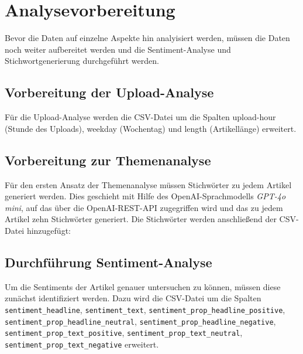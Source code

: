 \documentclass[12pt]{article}
\begin{document}
\begin{sloppypar}
	

	\section{Analysevorbereitung}

	Bevor die Daten auf einzelne Aspekte hin analyisiert werden, müssen die
	Daten noch weiter aufbereitet werden und die Sentiment-Analyse und
	Stichwortgenerierung durchgeführt werden.

	\subsection{Vorbereitung der Upload-Analyse}

	Für die Upload-Analyse werden die CSV-Datei um die Spalten upload-hour
	(Stunde des Uploads), weekday (Wochentag) und length (Artikellänge)
	erweitert.

	

	\subsection{Vorbereitung zur Themenanalyse}

	Für den ersten Ansatz der Themenanalyse müssen Stichwörter zu jedem Artikel
	generiert werden. Dies geschieht mit Hilfe des OpenAI-Sprachmodells
	\emph{GPT-4o mini}, auf das über die OpenAI-REST-API zugegriffen wird und
	das zu jedem Artikel zehn Stichwörter generiert. Die Stichwörter werden
	anschließend der CSV-Datei hinzugefügt:

	

	\subsection{Durchführung Sentiment-Analyse}

	\raggedright
	Um die Sentiments der Artikel genauer untersuchen zu können, müssen diese
	zunächst identifiziert werden. Dazu wird die CSV-Datei um die Spalten
	\texttt{sentiment\_headline}, \texttt{sentiment\_text}, \texttt{sentiment\_prop\_headline\_positive},
	\texttt{sentiment\_prop\_headline\_neutral}, \texttt{sentiment\_prop\_headline\_negative},
	\texttt{sentiment\_prop\_text\_positive}, \texttt{sentiment\_prop\_text\_neutral},
	\texttt{sentiment\_prop\_text\_negative} erweitert.
	\raggedright


\end{sloppypar}
\end{document}
